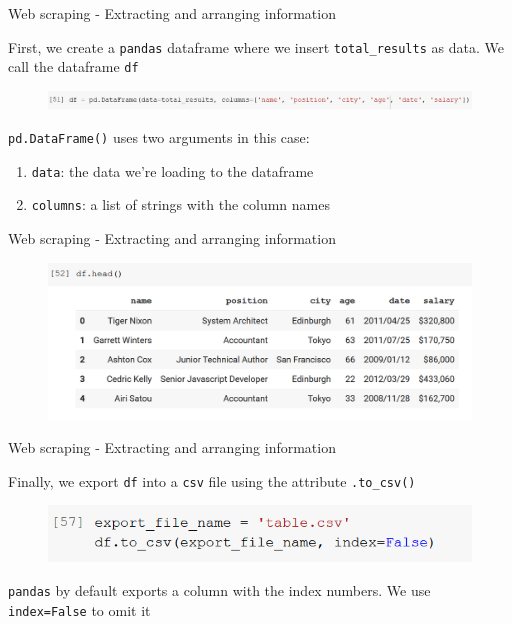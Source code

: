 \documentclass[aspectratio=169]{beamer}
\begin{document}
\begin{frame}{Web scraping - Extracting and arranging information}

	First, we create a \texttt{pandas} dataframe where we insert \texttt{total\_results} as data. We call the dataframe \texttt{df}

	\begin{figure}
		\centering
		\includegraphics[width=\linewidth]{img/df.png}
	\end{figure}

	\texttt{pd.DataFrame()} uses two arguments in this case:

	\begin{enumerate}
		\item \texttt{data}: the data we're loading to the dataframe
		\item \texttt{columns}: a list of strings with the column names
	\end{enumerate}

\end{frame}

\begin{frame}{Web scraping - Extracting and arranging information}

	\begin{figure}
		\centering
		\includegraphics[width=\linewidth]{img/df_head.png}
	\end{figure}

\end{frame}

\begin{frame}{Web scraping - Extracting and arranging information}

	Finally, we export \texttt{df} into a \texttt{csv} file using the attribute \texttt{.to\_csv()}

	\begin{figure}
		\centering
		\includegraphics[width=0.6\linewidth]{img/df_to_csv.png}
	\end{figure}

	\texttt{pandas} by default exports a column with the index numbers. We use \texttt{index=False} to omit it 

\end{frame}
\end{document}
